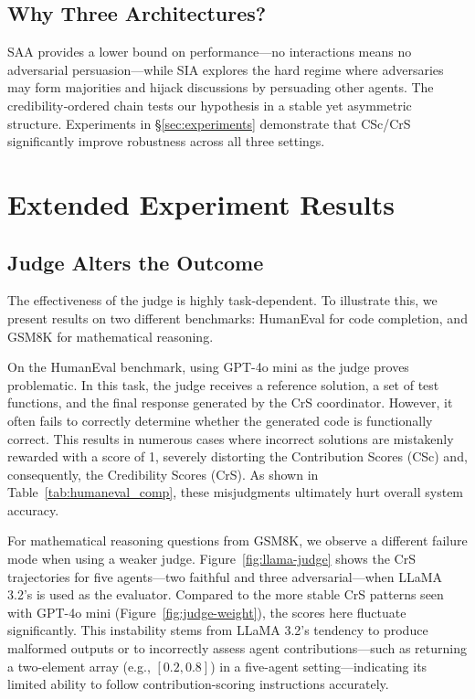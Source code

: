 
\subsection{Why Three Architectures?}
SAA provides a lower bound on performance—no interactions means no adversarial persuasion—while SIA explores the hard regime where adversaries may form majorities and hijack discussions by persuading other agents. The credibility‑ordered chain tests our hypothesis in a stable yet asymmetric structure. Experiments in \S\ref{sec:experiments} demonstrate that CSc/CrS significantly improve robustness across all three settings.

\section{Extended Experiment Results}\label{app:exp-ext}


\subsection{Judge Alters the Outcome}

The effectiveness of the judge is highly task-dependent. To illustrate this, we present results on two different benchmarks: HumanEval for code completion, and GSM8K for mathematical reasoning.

On the HumanEval benchmark, using GPT-4o mini as the judge proves problematic. In this task, the judge receives a reference solution, a set of test functions, and the final response generated by the CrS coordinator. However, it often fails to correctly determine whether the generated code is functionally correct. This results in numerous cases where incorrect solutions are mistakenly rewarded with a score of 1, severely distorting the Contribution Scores (CSc) and, consequently, the Credibility Scores (CrS). As shown in Table~\ref{tab:humaneval_comp}, these misjudgments ultimately hurt overall system accuracy.

For mathematical reasoning questions from GSM8K, we observe a different failure mode when using a weaker judge. Figure~\ref{fig:llama-judge} shows the CrS trajectories for five agents—two faithful and three adversarial—when LLaMA 3.2's is used as the evaluator. Compared to the more stable CrS patterns seen with GPT-4o mini (Figure~\ref{fig:judge-weight}), the scores here fluctuate significantly. This instability stems from LLaMA 3.2's tendency to produce malformed outputs or to incorrectly assess agent contributions—such as returning a two-element array (e.g., $[0.2, 0.8]$) in a five-agent setting—indicating its limited ability to follow contribution-scoring instructions accurately.  

